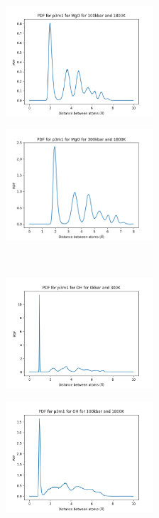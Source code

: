 \documentclass[a4paper,12pt]{article}
\begin{document}
\begin{figure}[h!!!!!!!!!!!!]
\begin{subfigure}{0.32\textwidth}
	\label{Fig12d}
\end{subfigure}%
	\begin{subfigure}{0.32\textwidth}
	\centering
	\includegraphics[width=5.5cm]{figures/p3_pdf_MgO_p100_t1800.png}
	\label{Fig12e}
\end{subfigure}%
	\begin{subfigure}{0.32\textwidth}
	\centering
	\includegraphics[width=5.5cm]{figures/pdfMgOp3p300t1800c100.png}
	\label{Fig12f}
\end{subfigure}%
\\	
\begin{subfigure}{0.32\textwidth}
	\centering
	\includegraphics[width=5.5cm]{figures/p3_pdf_OH_p0_t300.png}
	\label{Fig12g}
\end{subfigure}%
\begin{subfigure}{0.32\textwidth}
	\centering
	\includegraphics[width=5.5cm]{figures/p3_pdf_OH_p100_t1800.png}

\end{subfigure}
\end{figure}
\end{document}

